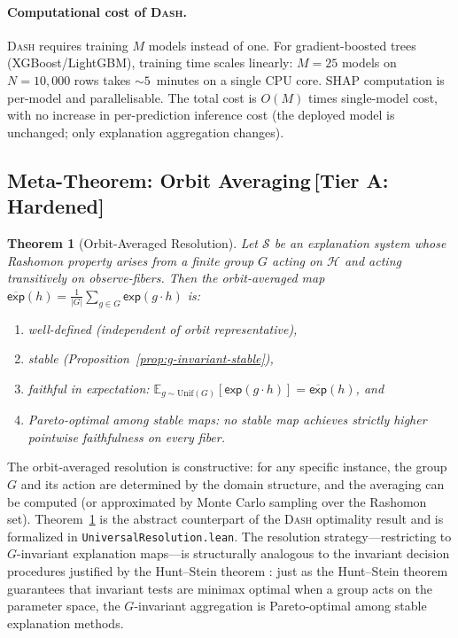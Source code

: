 \documentclass[11pt,a4paper]{article}
\newtheorem{theorem}{Theorem}[section]
\newcommand{\E}{\mathbb{E}}
\newcommand{\DASH}{\textsc{Dash}}
\newcommand{\sH}{\mathcal{H}}
\begin{document}
\paragraph{Computational cost of \DASH{}.}
\DASH{} requires training $M$ models instead of one. For gradient-boosted trees (XGBoost/LightGBM), training time scales linearly: $M = 25$ models on $N = 10{,}000$ rows takes ${\sim}5$~minutes on a single CPU core. SHAP computation is per-model and parallelisable. The total cost is $O(M)$ times single-model cost, with no increase in per-prediction inference cost (the deployed model is unchanged; only explanation aggregation changes).

\subsection{Meta-Theorem: Orbit Averaging\,\textnormal{\normalsize[Tier A: Hardened]}}
\label{sec:meta-theorem}

\begin{theorem}[Orbit-Averaged Resolution]
\label{thm:orbit-average}
Let $\mathcal{S}$ be an explanation system whose Rashomon property arises
from a finite group $G$ acting on $\sH$ and acting transitively on
observe-fibers.  Then the orbit-averaged map
$\overline{\mathsf{exp}}(h) = \frac{1}{|G|}\sum_{g \in G}\mathsf{exp}(g \cdot h)$
is:
\begin{enumerate}[label=(\roman*)]
  \item well-defined (independent of orbit representative),
  \item stable (Proposition~\ref{prop:g-invariant-stable}),
  \item faithful in expectation: $\E_{g \sim \mathrm{Unif}(G)}[\mathsf{exp}(g \cdot h)] = \overline{\mathsf{exp}}(h)$, and
  \item Pareto-optimal among stable maps: no stable map achieves strictly
    higher pointwise faithfulness on every fiber.
\end{enumerate}
\end{theorem}

\noindent
The orbit-averaged resolution is constructive: for any specific instance, the
group $G$ and its action are determined by the domain structure, and the
averaging can be computed (or approximated by Monte Carlo sampling over the
Rashomon set).  Theorem~\ref{thm:orbit-average} is the abstract counterpart
of the \DASH{} optimality result and is formalized in
\texttt{UniversalResolution.lean}.
The resolution strategy---restricting to $G$-invariant explanation maps---is
structurally analogous to the invariant decision procedures justified by the
Hunt--Stein theorem \citep{lehmann2005testing}: just as the Hunt--Stein theorem
guarantees that invariant tests are minimax optimal when a group acts on the
parameter space, the $G$-invariant aggregation is Pareto-optimal among stable
explanation methods.
\end{document}
